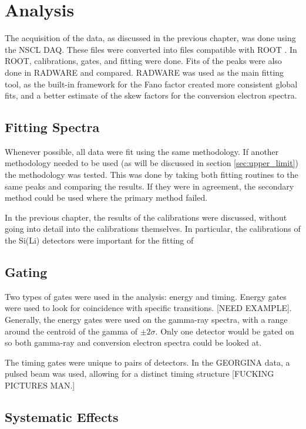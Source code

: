 \chapter{Analysis}
\label{ch:analysis}

The acquisition of the data, as discussed in the previous chapter, was done using the NSCL DAQ. These files were converted into files compatible with ROOT \citep{brun97:_root}. In ROOT, calibrations, gates, and fitting were done. Fits of the peaks were also done in RADWARE \citep{radford00:_radware} and compared. RADWARE was used as the main fitting tool, as the built-in framework for the Fano factor created more consistent global fits, and a better estimate of the skew factors for the conversion electron spectra.

\section{Fitting Spectra}
\label{sec:fitting}

Whenever possible, all data were fit using the same methodology. If another methodology needed to be used (as will be discussed in section \ref{sec:upper_limit}) the methodology was tested. This was done by taking both fitting routines to the same peaks and comparing the results. If they were in agreement, the secondary method could be used where the primary method failed.

In the previous chapter, the results of the calibrations were discussed, without going into detail into the calibrations themselves. In particular, the calibrations of the Si(Li) detectors were important for the fitting of 

\section{Gating}

Two types of gates were used in the analysis: energy and timing. Energy gates were used to look for coincidence with specific transitions. [NEED EXAMPLE]. Generally, the energy gates were used on the gamma-ray spectra, with a range around the centroid of the gamma of $\pm2\sigma$. Only one detector would be gated on so both gamma-ray and conversion electron spectra could be looked at.

The timing gates were unique to pairs of detectors. In the GEORGINA data, a pulsed beam was used, allowing for a distinct timing structure [FUCKING PICTURES MAN.]

\section{Systematic Effects}

